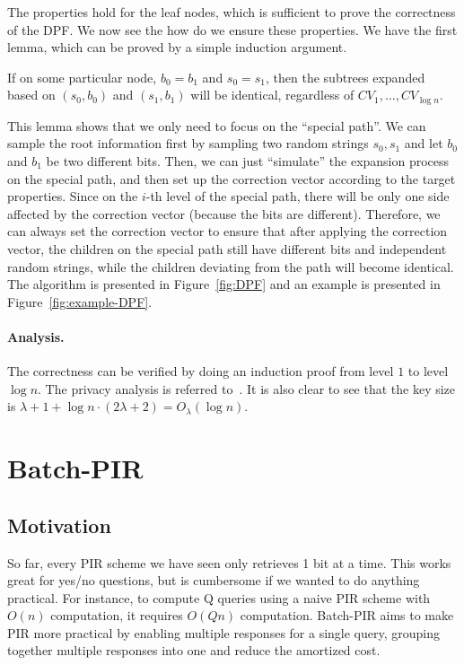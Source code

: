 The properties hold for the leaf nodes, which is sufficient to prove the correctness of the DPF.
We now see the how do we ensure these properties.
We have the first lemma, which can be proved by a simple induction argument.

\begin{lemma}
    If on some particular node, $b_0=b_1$ and $s_0=s_1$, then the subtrees expanded based on $(s_0,b_0)$ and $(s_1,b_1)$ will be identical, regardless of $CV_1,\dots,CV_{\log n}$.
\end{lemma}

This lemma shows that we only need to focus on the ``special path''. We can sample the root information first by sampling two random strings $s_0,s_1$ and let $b_0$ and $b_1$ be two different bits. 
Then, we can just ``simulate'' the expansion process on the special path, and then set up the correction vector according to the target properties. 
Since on the $i$-th level of the special path, there will be only one side affected by the correction vector (because the bits are different).
Therefore, we can always set the correction vector to ensure that after applying the correction vector, the children on the special path still have different bits and independent random strings, while the children deviating from the path will become identical.
The algorithm is presented in Figure~\ref{fig:DPF} and an example is presented in Figure~\ref{fig:example-DPF}.


\paragraph{Analysis.}
The correctness can be verified by doing an induction proof from level $1$ to level $\log n$.
The privacy analysis is referred to~\cite{boyle2016function}. 
It is also clear to see that the key size is $\lambda+1+\log n\cdot (2\lambda+2)=O_\lambda(\log n)$.



 \section{Batch-PIR}

 \subsection{Motivation}
    So far, every PIR scheme we have seen only retrieves 1 bit at a time. This works great for yes/no questions,
    but is cumbersome if we wanted to do anything practical. For instance, to compute Q queries using a naive PIR scheme with $O(n)$ computation, it requires $O(Qn)$ computation.
    Batch-PIR aims to make PIR more practical by enabling multiple
    responses for a single query, grouping together multiple responses into one and reduce the
     amortized cost.
     
